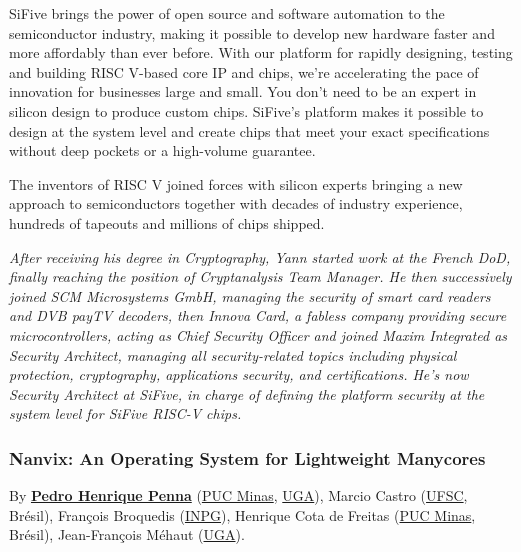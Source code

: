 \documentclass[a4paper, 10pt]{article}
\begin{document}
{SiFive brings the power of open source and software automation to the
semiconductor industry, making it possible to develop new hardware
faster and more affordably than ever before. With our platform for
rapidly designing, testing and building RISC V-based core IP and
chips, we’re accelerating the pace of innovation for businesses large
and small.  You don’t need to be an expert in silicon design to
produce custom chips. SiFive’s platform makes it possible to design at
the system level and create chips that meet your exact specifications
without deep pockets or a high-volume guarantee.

The inventors of RISC V joined forces with silicon experts bringing a
new approach to semiconductors together with decades of industry
experience, hundreds of tapeouts and millions of chips shipped.

\emph{\footnotesize After receiving his degree in Cryptography, Yann started work at the French DoD, finally reaching the position of Cryptanalysis Team Manager. He then successively joined SCM Microsystems GmbH, managing the security of smart card readers and DVB payTV decoders, then Innova Card, a fabless company providing secure microcontrollers, acting as Chief Security Officer and joined Maxim Integrated as Security Architect, managing all security-related topics including physical protection, cryptography, applications security, and certifications.  He’s now Security Architect at SiFive, in charge of defining the platform security at the system level for SiFive RISC-V chips.}

\subsubsection{Nanvix: An Operating System for Lightweight Manycores}
\label{sec:org749a93b}
By \textbf{\href{http://www.sites.google.com/view/ppenna}{Pedro Henrique Penna}}
(\href{https://www.pucminas.br}{PUC Minas},
\href{https://www.univ-grenoble-alpes.fr}{UGA}), Marcio Castro
(\href{http://ufsc.br}{UFSC}, Brésil), François Broquedis
(\href{http://www.grenoble-inp.fr}{INPG}), Henrique Cota de Freitas
(\href{https://www.pucminas.br}{PUC Minas}, Brésil), Jean-François Méhaut
(\href{https://www.univ-grenoble-alpes.fr}{UGA}).

}
\end{document}
